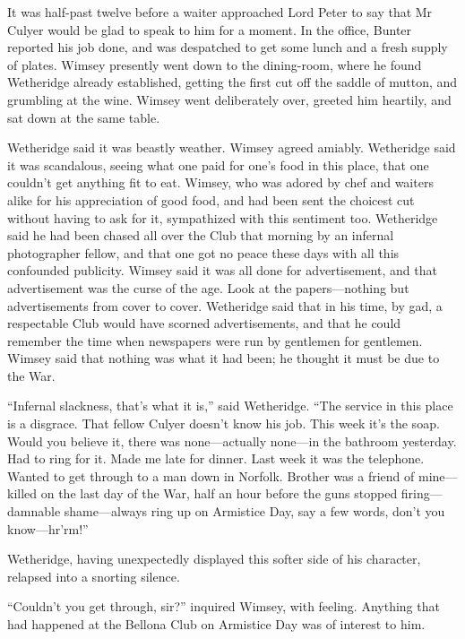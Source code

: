 It was half-past twelve before a waiter approached Lord Peter to say that Mr Culyer would be glad to speak to him for a moment. In the office, Bunter reported his job done, and was despatched to get some lunch and a fresh supply of plates. Wimsey presently went down to the dining-room, where he found Wetheridge already established, getting the first cut off the saddle of mutton, and grumbling at the wine. Wimsey went deliberately over, greeted him heartily, and sat down at the same table.

Wetheridge said it was beastly weather. Wimsey agreed amiably. Wetheridge said it was scandalous, seeing what one paid for one's food in this place, that one couldn't get anything fit to eat. Wimsey, who was adored by chef and waiters alike for his appreciation of good food, and had been sent the choicest cut without having to ask for it, sympathized with this sentiment too. Wetheridge said he had been chased all over the Club that morning by an infernal photographer fellow, and that one got no peace these days with all this confounded publicity. Wimsey said it was all done for advertisement, and that advertisement was the curse of the age. Look at the papers\allowbreak---\allowbreak nothing but advertisements from cover to cover. Wetheridge said that in his time, by gad, a respectable Club would have scorned advertisements, and that he could remember the time when newspapers were run by gentlemen for gentlemen. Wimsey said that nothing was what it had been; he thought it must be due to the War.

\enquote{Infernal slackness, that's what it is,} said Wetheridge. \enquote{The service in this place is a disgrace. That fellow Culyer doesn't know his job. This week it's the soap. Would you believe it, there was none\allowbreak---\allowbreak actually none\allowbreak---\allowbreak in the bathroom yesterday. Had to ring for it. Made me late for dinner. Last week it was the telephone. Wanted to get through to a man down in Norfolk. Brother was a friend of mine\allowbreak---\allowbreak killed on the last day of the War, half an hour before the guns stopped firing\allowbreak---\allowbreak damnable shame\allowbreak---\allowbreak always ring up on Armistice Day, say a few words, don't you know\allowbreak---\allowbreak hr'rm!}

Wetheridge, having unexpectedly displayed this softer side of his character, relapsed into a snorting silence.

\enquote{Couldn't you get through, sir?} inquired Wimsey, with feeling. Anything that had happened at the Bellona Club on Armistice Day was of interest to him.

